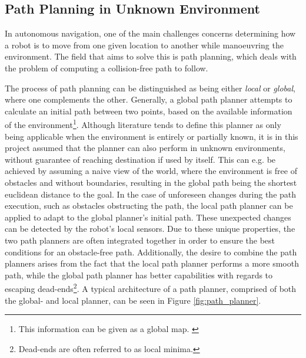 \subsection{Path Planning in Unknown Environment}


In autonomous navigation, one of the main challenges concerns determining how a robot is to move from one given location to another while manoeuvring the environment. The field that aims to solve this is path planning, which deals with the problem of computing a collision-free path to follow. 

The process of path planning can be distinguished as being either \textit{local} or \textit{global}, where one complements the other. Generally, a global path planner attempts to calculate an initial path between two points, based on the available information of the environment\footnote{This information can be given as a global map. \cite{PathPlanning:introduction_to_MR}}. Although literature tends to define this planner as only being applicable when the environment is entirely or partially known, it is in this project assumed that the planner can also perform in unknown environments, without guarantee of reaching destination if used by itself. This can e.g. be achieved by assuming a naive view of the world, where the environment is free of obstacles and without boundaries, resulting in the global path being the shortest euclidean distance to the goal. In the case of unforeseen changes during the path execution, such as obstacles obstructing the path, the local path planner can be applied to adapt to the global planner's initial path. These unexpected changes can be detected by the robot's local sensors. Due to these unique properties, the two path planners are often integrated together in order to ensure the best conditions for an obstacle-free path. Additionally, the desire to combine the path planners arises from the fact that the local path planner performs a more smooth path, while the global path planner has better capabilities with regards to escaping dead-ends\footnote{Dead-ends are often referred to as local minima.}. A typical architecture of a path planner, comprised of both the global- and local planner, can be seen in Figure \ref{fig:path_planner}. \cite{PathPlanning:introduction_to_MR}


